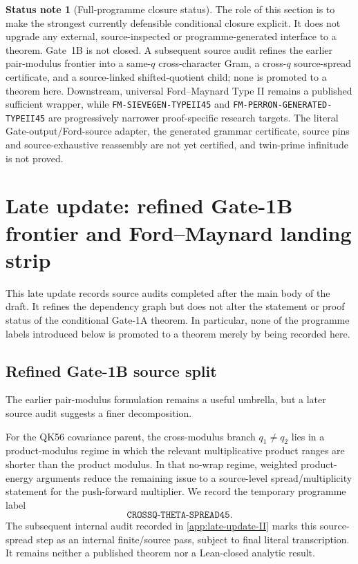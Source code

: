 \documentclass[11pt]{article}
\theoremstyle{definition}
\newtheorem{status}[status]{Status note}
\newcommand{\1}{\mathbf 1}
\begin{document}
\begin{status}[Full-programme closure status]
The role of this section is to make the strongest currently defensible
conditional closure explicit.  It does not upgrade any external,
source-inspected or programme-generated interface to a theorem.  Gate~1B is
not closed.  A subsequent source audit refines the earlier pair-modulus
frontier into a same-$q$ cross-character Gram, a cross-$q$ source-spread
certificate, and a source-linked shifted-quotient child; none is promoted to a
theorem here.  Downstream, universal Ford--Maynard Type II remains a published
sufficient wrapper, while \texttt{FM-SIEVEGEN-TYPEII45} and
\texttt{FM-PERRON-GENERATED-TYPEII45} are progressively narrower
proof-specific research targets.  The literal Gate-output/Ford-source adapter,
the generated grammar certificate, source pins and source-exhaustive
reassembly are not yet certified, and twin-prime infinitude is not proved.
\end{status}


\section{Late update: refined Gate-1B frontier and Ford--Maynard landing strip}
\label{app:late-update}

This late update records source audits completed after the main body of the
draft.  It refines the dependency graph but does not alter the statement or
proof status of the conditional Gate-1A theorem.  In particular, none of the
programme labels introduced below is promoted to a theorem merely by being
recorded here.

\subsection{Refined Gate-1B source split}
The earlier pair-modulus formulation remains a useful umbrella, but a later
source audit suggests a finer decomposition.

For the QK56 covariance parent, the cross-modulus branch $q_1\ne q_2$ lies in a
product-modulus regime in which the relevant multiplicative product ranges
are shorter than the product modulus.  In that no-wrap regime, weighted
product-energy arguments reduce the remaining issue to a source-level
spread/multiplicity statement for the push-forward multiplier.  We record the
temporary programme label
\[
   \boxed{\texttt{CROSSQ-THETA-SPREAD45}}.
\]
The subsequent internal audit recorded in
\cref{app:late-update-II} marks this source-spread step as an internal
finite/source pass, subject to final literal transcription.  It remains neither
a published theorem nor a Lean-closed analytic result.
\end{document}
